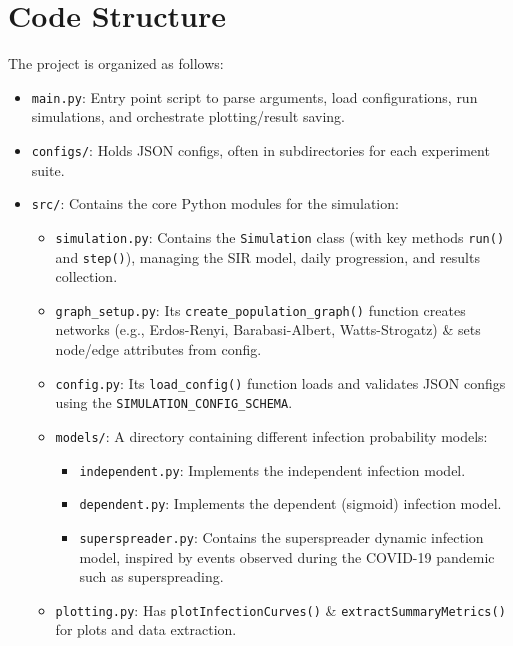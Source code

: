 \documentclass[12pt]{article}
\begin{document}
\section{Code Structure}
The project is organized as follows:
\begin{itemize}
  \item \texttt{main.py}: Entry point script to parse arguments, load configurations, run simulations, and orchestrate plotting/result saving.
  
  \item \texttt{configs/}: Holds JSON configs, often in subdirectories for each experiment suite.
  
  \item \texttt{src/}: Contains the core Python modules for the simulation:
  \begin{itemize}
    \item \texttt{simulation.py}: Contains the \texttt{Simulation} class (with key methods \texttt{run()} and \texttt{step()}), managing the SIR model, daily progression, and results collection.
    
    \item \texttt{graph\_setup.py}: Its \texttt{create\_population\_graph()} function creates networks (e.g., Erdos-Renyi, Barabasi-Albert, Watts-Strogatz) \& sets node/edge attributes from config.
    
    \item \texttt{config.py}: Its \texttt{load\_config()} function loads and validates JSON configs using the \texttt{SIMULATION\_CONFIG\_SCHEMA}.
    
    \item \texttt{models/}: A directory containing different infection probability models:
    \begin{itemize}
      \item \texttt{independent.py}: Implements the independent infection model.
      \item \texttt{dependent.py}: Implements the dependent (sigmoid) infection model.
      \item \texttt{superspreader.py}: Contains the super\-spread\-er dy\-nam\-ic in\-fec\-tion model, inspired by events observed during the COVID-19 pandemic such as super\-spread\-ing.
    \end{itemize}
    
    \item \texttt{plot\-ting.py}: Has \texttt{plotInfec\-tionCurves()} \& \texttt{extractSum\-maryMetrics()} for plots and data extraction.
    

\end{itemize}
\end{itemize}
\end{document}
